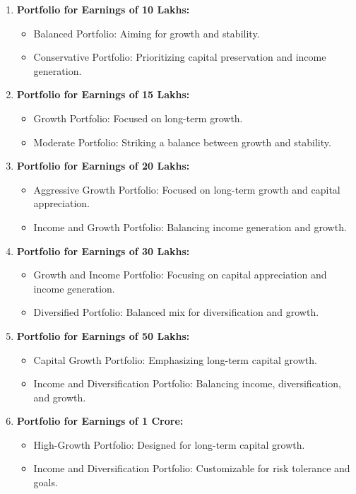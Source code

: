 \begin{enumerate}
    \item \textbf{Portfolio for Earnings of 10 Lakhs:}
    \begin{itemize}
        \item Balanced Portfolio: Aiming for growth and stability.
        \item Conservative Portfolio: Prioritizing capital preservation and income generation.
    \end{itemize}
    
    \item \textbf{Portfolio for Earnings of 15 Lakhs:}
    \begin{itemize}
        \item Growth Portfolio: Focused on long-term growth.
        \item Moderate Portfolio: Striking a balance between growth and stability.
    \end{itemize}
    
    \item \textbf{Portfolio for Earnings of 20 Lakhs:}
    \begin{itemize}
        \item Aggressive Growth Portfolio: Focused on long-term growth and capital appreciation.
        \item Income and Growth Portfolio: Balancing income generation and growth.
    \end{itemize}
    
    \item \textbf{Portfolio for Earnings of 30 Lakhs:}
    \begin{itemize}
        \item Growth and Income Portfolio: Focusing on capital appreciation and income generation.
        \item Diversified Portfolio: Balanced mix for diversification and growth.
    \end{itemize}
    
    \item \textbf{Portfolio for Earnings of 50 Lakhs:}
    \begin{itemize}
        \item Capital Growth Portfolio: Emphasizing long-term capital growth.
        \item Income and Diversification Portfolio: Balancing income, diversification, and growth.
    \end{itemize}
    
    \item \textbf{Portfolio for Earnings of 1 Crore:}
    \begin{itemize}
        \item High-Growth Portfolio: Designed for long-term capital growth.
        \item Income and Diversification Portfolio: Customizable for risk tolerance and goals.
    \end{itemize}
\end{enumerate}

